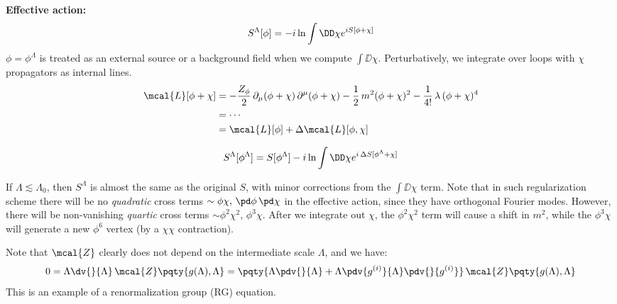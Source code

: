 \documentclass[a4paper
	,10pt
]{article}
\begin{document}
	\textbf{Effective action:}
	\begin{equation}
	  S^\Lambda[\phi]
	  = -i \ln \int \DD \chi
	      e^{iS[\phi + \chi]} \\
	\end{equation}
	$\phi = \phi^\Lambda$ is treated as an external source or a background field when we compute $\int \DD \chi$. Perturbatively, we integrate over loops with $\chi$ propagators as internal lines.
	\begin{equation}
	\begin{aligned}
	  \mcal{L}[\phi + \chi]
	  &= - \frac{Z_\phi}{2}\,
	      \partial_\mu (\phi + \chi)\,
	      \partial^\mu (\phi + \chi)
	    - \frac{1}{2}\, m^2
	      (\phi + \chi)^2
	    - \frac{1}{4!}\, \lambda\,
	      (\phi + \chi)^4\\
	  &= \cdots \\
	  &= \mcal{L}[\phi]
	    + \Delta\mcal{L} [\phi,\chi]
	\end{aligned}
	\end{equation}
	
	\begin{equation}
	  S^\Lambda[\phi^\Lambda]
	  = S[\phi^\Lambda]
	    - i \ln \int \DD \chi
	      e^{i\,\Delta S[\phi^\Lambda + \chi]} \\
	\end{equation}
	
	If $\Lambda \lesssim \Lambda_0$, then $S^\Lambda$ is almost
	the same as the original $S$, with minor corrections from the
	$\int \DD\chi$ term. Note that in such regularization scheme there will be no \textit{quadratic} cross terms $\sim \phi\chi,\, \pd\phi\,\pd\chi$ in the effective action, since they have orthogonal Fourier modes. However, there will be non-vanishing \textit{quartic} cross terms $\sim \phi^2\chi^2,\, \phi^3\chi$. After we integrate out $\chi$, the $\phi^2\chi^2$ term will cause a shift in $m^2$, while the $\phi^3\chi$ will generate a new $\phi^6$ vertex (by a $\chi\chi$ contraction).
	
	Note that $\mcal{Z}$ clearly does not depend on the intermediate scale $\Lambda$, and we have:
	\begin{equation}
	  0
	  = \Lambda \dv{}{\Lambda}\,
	    \mcal{Z}\pqty{g(\Lambda),\Lambda}
	  = \pqty{
	      \Lambda \pdv{}{\Lambda}
	      + \Lambda \pdv{g^{(i)}}{\Lambda}
	        \pdv{}{g^{(i)}}
	    }\,
	    \mcal{Z}\pqty{g(\Lambda),\Lambda}
	\end{equation}
	This is an example of a {renormalization group (RG) equation}.
	
\end{document}
